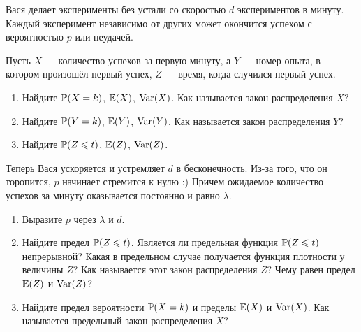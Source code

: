 \begin{problem}
Вася делает эксперименты без устали со скоростью $d$ экспериментов в минуту. Каждый эксперимент независимо от других может окончится успехом с вероятностью $p$ или неудачей.

Пусть $X$ — количество успехов за первую минуту, а $Y$ — номер опыта, в котором произошёл первый успех, $Z$ — время, когда случился первый успех.
\begin{enumerate}
\item Найдите $\P(X = k)$, $\E(X)$, $\Var(X)$. Как называется закон распределения $X$?
\item Найдите $\P(Y = k)$, $\E(Y)$, $\Var(Y)$. Как называется закон распределения $Y$?
\item Найдите $\P(Z \leq t)$, $\E(Z)$, $\Var(Z)$.
\end{enumerate}

Теперь Вася ускоряется и устремляет $d$ в бесконечность. Из-за того, что он торопится, $p$ начинает стремится к нулю :) Причем ожидаемое количество успехов за минуту оказывается постоянно и равно $\lambda$.

\begin{enumerate}[resume]
\item Выразите $p$ через $\lambda$ и $d$.
\item Найдите предел $\P(Z \leq t)$. Является ли предельная функция $\P(Z \leq t)$ непрерывной? Какая в предельном случае получается функция плотности у величины $Z$? Как называется этот закон распределения $Z$? Чему равен предел $\E(Z)$ и $\Var(Z)$?
\item Найдите предел вероятности $\P(X = k)$ и пределы $\E(X)$ и $\Var(X)$. Как называется предельный закон распределения $X$?
\end{enumerate}
\begin{sol}
\end{sol}
\end{problem}

